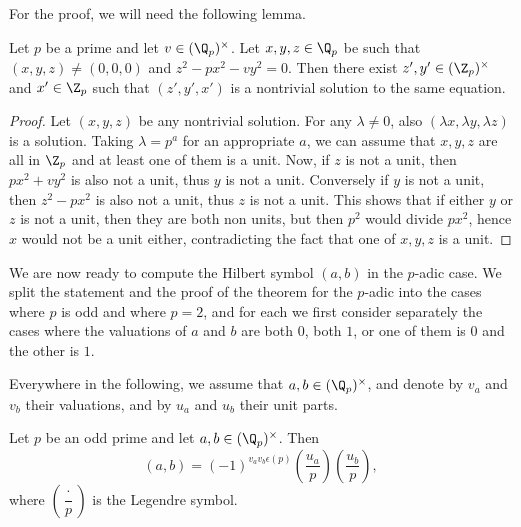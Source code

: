 For the proof, we will need the following lemma.
\begin{lemma}
	\label{lem:nontrivialzero}
	\leanok
Let $p$ be a prime and let $v \in (\Q_p)^\times$. Let $x, y, z \in \Q_p$ be such that
$(x, y, z) \ne (0, 0, 0)$ and $z^2 - p x^2 - v y^2 = 0$. Then there exist
$z', y' \in (\Z_p)^\times$ and $x' \in \Z_p$ such that $(z', y', x')$ is a nontrivial solution to
the same equation.
\end{lemma}
\begin{proof}
	Let $(x,y,z)$ be any nontrivial solution. For any $\lambda \ne 0$, also $(\lambda x, \lambda y,
	\lambda z)$ is a solution. Taking $\lambda = p^a$ for an appropriate $a$, we can assume that
	$x,y,z$ are all in $\Z_p$ and at least one of them is a unit. Now, if $z$ is not a unit, then
	$px^2+vy^2$ is also not a unit, thus $y$ is not a unit. Conversely if $y$ is not a unit, then
	$z^2-px^2$ is also not a unit, thus $z$ is not a unit. This shows that if either $y$ or $z$ is not
	a unit, then they are both non units, but then $p^2$ would divide $px^2$, hence $x$ would not be a
	unit either, contradicting the fact that one of $x,y,z$ is a unit.
\end{proof}

We are now ready to compute the Hilbert symbol $(a,b)$ in the $p$-adic case.
We split the statement and the proof of the theorem for the $p$-adic into the cases where $p$ is odd
and where $p = 2$, and for each we first consider separately the cases where the valuations of $a$
and $b$ are both $0$, both $1$, or one of them is $0$ and the other is $1$.

Everywhere in the following, we assume that $a, b \in (\Q_p)^\times$, and denote by $v_a$ and $v_b$
their valuations, and by $u_a$ and $u_b$ their unit parts.

\begin{theorem}
	\label{thm:padic_odd_p}
	\leanok
Let $p$ be an odd prime and let $a, b \in (\Q_p)^\times$. Then
\[(a,b) = (-1)^{v_a v_b\epsilon(p)}\left(\dfrac{u_a}{p}\right) \left(\dfrac{u_b}{p}\right),\]
where $\left(\dfrac{\cdot}{p}\right)$ is the Legendre symbol.
\end{theorem}

